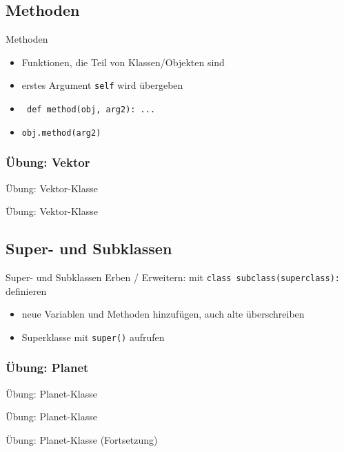 \subsection{Methoden}
\begin{frame}{Methoden}
	\begin{itemize}
		\item Funktionen, die Teil von Klassen/Objekten sind
		\item<2-> erstes Argument \texttt{self} wird übergeben
        \item<3-> \texttt{    def method(obj, arg2): ...}
        \item<3-> \texttt{obj.method(arg2)}
	\end{itemize}
\end{frame}

\subsubsection{Übung: Vektor}
\begin{frame}{Übung: Vektor-Klasse}
    
    \end{frame}
\begin{frame}{Übung: Vektor-Klasse}
    
    \end{frame}

\subsection{Super- und Subklassen}
\begin{frame}{Super- und Subklassen}
	Erben / Erweitern: mit \alert{\tt class subclass(superclass):} definieren
	\begin{itemize}
		\item neue Variablen und Methoden hinzufügen, auch alte überschreiben
		\item Superklasse mit \alert{\tt super()} aufrufen
    \end{itemize}
	
\end{frame}
\subsubsection{Übung: Planet}
\begin{frame}{Übung: Planet-Klasse}
    
\end{frame}
\begin{frame}{Übung: Planet-Klasse}
    
\end{frame}
\begin{frame}{Übung: Planet-Klasse (Fortsetzung)}
    
\end{frame}

